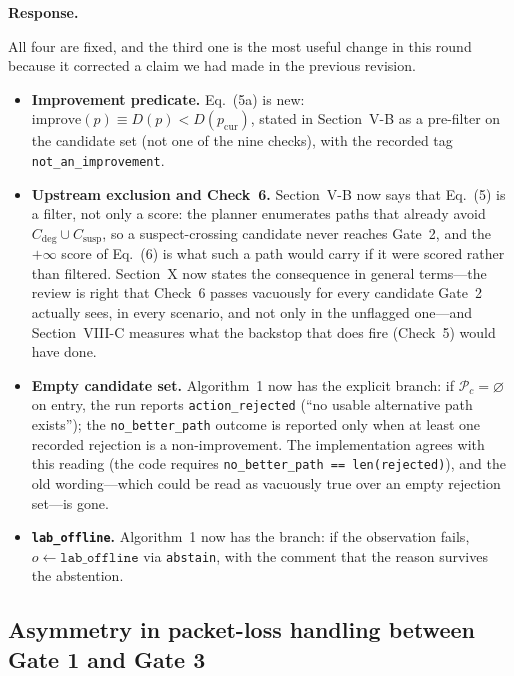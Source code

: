 \documentclass[11pt,a4paper]{article}
\newenvironment{response}{\par\noindent\begin{minipage}{\linewidth}\small\textbf{Response.}\par}{\end{minipage}\medskip\par}
\begin{document}
\begin{response}
All four are fixed, and the third one is the most useful change in this
round because it corrected a claim we had made in the previous revision.

\begin{itemize}
  \item \textbf{Improvement predicate.} Eq.~(5a) is new:
    $\mathrm{improve}(p)\equiv D(p)<D(p_{\mathrm{cur}})$, stated in
    Section~V-B as a pre-filter on the candidate set (not one of the nine
    checks), with the recorded tag \texttt{not\_an\_improvement}.
  \item \textbf{Upstream exclusion and Check~6.} Section~V-B now says that
    Eq.~(5) is a filter, not only a score: the planner enumerates paths
    that already avoid $C_{\mathrm{deg}}\cup C_{\mathrm{susp}}$, so a
    suspect-crossing candidate never reaches Gate~2, and the $+\infty$
    score of Eq.~(6) is what such a path would carry if it were scored
    rather than filtered. Section~X now states the consequence in general
    terms---the review is right that Check~6 passes vacuously for every
    candidate Gate~2 actually sees, in every scenario, and not only in the
    unflagged one---and Section~VIII-C measures what the backstop that
    does fire (Check~5) would have done.
  \item \textbf{Empty candidate set.} Algorithm~1 now has the explicit
    branch: if $\mathcal{P}_c=\varnothing$ on entry, the run reports
    \texttt{action\_rejected} (``no usable alternative path exists''); the
    \texttt{no\_better\_path} outcome is reported only when at least one
    recorded rejection is a non-improvement. The implementation agrees
    with this reading (the code requires \texttt{no\_better\_path ==
    len(rejected)}), and the old wording---which could be read as
    vacuously true over an empty rejection set---is gone.
  \item \textbf{\texttt{lab\_offline}.} Algorithm~1 now has the branch:
    if the observation fails, $o\gets\texttt{lab\_offline}$ via
    \texttt{abstain}, with the comment that the reason survives the
    abstention.
\end{itemize}
\end{response}

\subsection{Asymmetry in packet-loss handling between Gate 1 and Gate 3}
\end{document}
